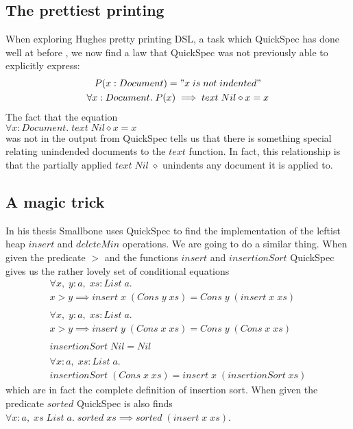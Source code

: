 \subsection{The prettiest printing}
    When exploring Hughes pretty printing DSL, %
    a task which QuickSpec has done well at before%
    , we now find a law that QuickSpec
    was not previously able to explicitly express:
    \begin{gather*}
        P(x:Document) = "x\; is\; not\; indented"\\
        \forall x:Document.\; P(x)\implies text\;Nil\diamond x=x
    \end{gather*}
    The fact that the equation\\
    $\forall x:Document.\; text\;Nil\diamond x = x$\\
    was not in the output from QuickSpec tells us that there is something special
    relating unindended documents to the $text$ function. In fact, this relationship
    is that the partially applied $text\;Nil\;\diamond$ unindents any document it is applied to. 

\subsection{A magic trick}
    In his thesis Smallbone %
    uses QuickSpec to find the implementation of the leftist
    heap $insert$ and $deleteMin$ operations. 
    We are going to do a similar thing. When given the predicate
    $>$ and the functions $insert$ and $insertionSort$ QuickSpec gives us
    the rather lovely set of conditional equations
    \begin{gather*}
        \forall x,\;y:a,\; xs:List\; a.\\
        x > y \implies insert\; x\; (Cons\; y\; xs) = Cons\; y\; (insert\; x\; xs)\\\\
        \forall x,\;y:a,\; xs:List\; a.\\
        x > y \implies insert\; y\; (Cons\; x\; xs) = Cons\; y\; (Cons\; x\; xs)\\\\
        insertionSort\; Nil = Nil\\\\
        \forall x:a,\; xs:List\; a.\\
        insertionSort\; (Cons\; x\; xs) = insert\; x\; (insertionSort\; xs)
    \end{gather*}
    which are in fact the complete definition of insertion sort.
    When given the predicate $sorted$ QuickSpec is also finds
    $\forall x:a,\; xs\;List\;a.\; sorted\; xs \implies sorted\; (insert\; x\; xs)$.
